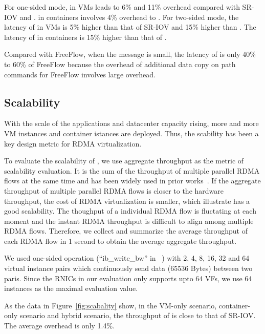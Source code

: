 For one-sided mode, \sys in VMs leads to 6\% and 11\% overhead compared with SR-IOV and \native. \sys in containers involves 4\% overhead to \native. For two-sided mode, the latency of \sys in VMs is 5\% higher than that of SR-IOV and 15\% higher than \native. The latency of \sys in containers is 15\% higher than that of \native.

Compared with FreeFlow, when the message is small, the latency of \sys is only 40\% to 60\% of FreeFlow because the overhead of additional data copy on path commands for FreeFlow involves large overhead. 





\subsection{Scalability}

With the scale of the applications and datacenter capacity rising, more and more VM instances and container istances are deployed. Thus, the scability has been a key design metric for RDMA virtualization.

To evaluate the scalability of \sys, we use aggregate throughput as the metric of scalability evaluation. It is the sum of the throughput of multiple parallel RDMA flows at the same time and has been widely used in prior works~\cite{kim2019freeflow, pfefferle2015hybrid, he2020masq}. If the aggregate throughput of multiple parallel RDMA flows is closer to the hardware throughput, the cost of RDMA virtualization is smaller, which illustrate \sys has a good scalability. The thoughput of a individual RDMA flow is fluctating at each moment and the instant RDMA throughput is difficult to align among multiple RDMA flows. Therefore, we collect and summarize the average throughput of each RDMA flow in 1 second to obtain the average aggregate throughput.

We used one-sided operation (``ib\_write\_bw'' in ~\cite{perftest}) with 2, 4, 8, 16, 32 and 64 virtual instance pairs which continuously send data (65536 Bytes) between two paris. Since the RNICs in our evaluation only supports upto 64 VFs, we use 64 instances as the maximal evaluation value.

As the data in Figure~\ref{fig:scabality} show, in the VM-only scenario, container-only scenario and hybrid scenario, the throughput of \sys is close to that of SR-IOV. The average overhead is only 1.4\%.


